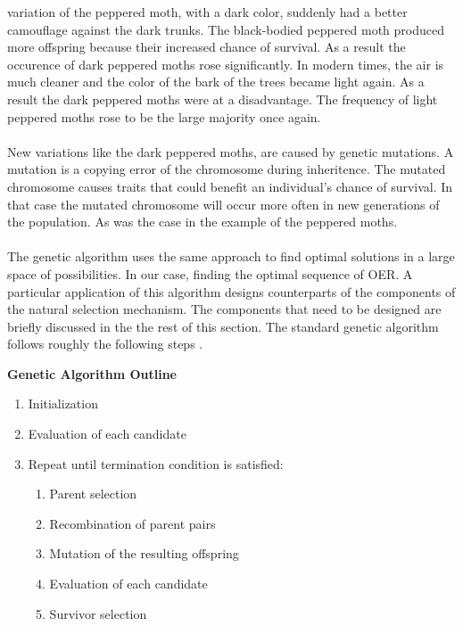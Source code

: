 variation of the peppered moth, with a dark color, suddenly had a better
camouflage against the dark trunks. The black-bodied peppered moth produced
more offspring because their increased chance of survival. As a result the
occurence of dark peppered moths rose significantly.
In modern times, the air is much cleaner and the color of the bark of the trees
became light again. As a result the dark peppered moths were at a disadvantage.
The frequency of light peppered moths rose to be the large majority once
again.\\\\
\noindent
New variations like the dark peppered moths, are caused by genetic mutations. A
mutation is a copying error of the chromosome during inheritence. The
mutated chromosome causes traits that could benefit an individual's chance of
survival. In that case the mutated chromosome will occur more often in new
generations of the population. As was the case in the example of the peppered
moths.\\\\
The genetic algorithm uses the same approach to find optimal solutions in a
large space of possibilities. In our case, finding the optimal sequence of OER.
A particular application of this algorithm designs counterparts of the
components of the natural selection mechanism. The components that need to be
designed are briefly discussed in the the rest of this section. The standard
genetic algorithm follows roughly the following steps \citep{Eiben2007}.
\begin{leftbar}
\smallskip
\noindent
\textbf{Genetic Algorithm Outline}
\begin{enumerate}
	\item Initialization
	\item Evaluation of each candidate
	\item Repeat until termination condition is satisfied:
		\begin{enumerate}
			\item Parent selection
			\item Recombination of parent pairs
			\item Mutation of the resulting offspring
			\item Evaluation of each candidate
			\item Survivor selection
		\end{enumerate}
\end{enumerate}
\end{leftbar}
